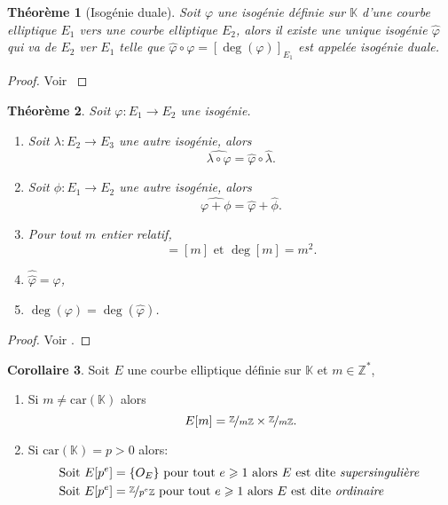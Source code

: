 \documentclass[10pt,a4paper]{book}
\theoremstyle{plain}
\newtheorem{thm}{Théorème}[chapter]
\theoremstyle{definition}
\theoremstyle{definition}
\newtheorem{cor}[thm]{Corollaire}
\theoremstyle{definition}
\theoremstyle{definition}
\theoremstyle{remark}
\theoremstyle{remark}
\theoremstyle{definition}
\begin{document}
\begin{thm}[Isogénie duale]
Soit $\varphi$ une isogénie définie sur $\mathbb{K}$ d'une courbe elliptique 
$E_1$ vers une courbe elliptique $E_2$, alors il existe une unique isogénie 
$\widehat{\varphi}$ qui va de $E_2$ ver $E_1$ telle que $\widehat{\varphi}\circ
\varphi=[\deg(\varphi)]_{E_1}$ est appelée \emph{isogénie duale}.
\end{thm}

\begin{proof}
Voir \cite[III.6.1]{Silv1}
\end{proof}

\begin{thm}
Soit $\varphi:E_1 \rightarrow E_2$ une isogénie.
\begin{enumerate}
\item Soit $\lambda:E_2 \rightarrow E_3$ une autre isogénie, alors
\begin{equation*}
\widehat{\lambda \circ \varphi}= \widehat{\varphi} \circ \widehat{\lambda}.
\end{equation*} 
\item Soit $\phi:E_1 \rightarrow E_2$ une autre isogénie, alors
\begin{equation*}
\widehat{\varphi+\phi}=\widehat{\varphi}+\widehat{\phi}.
\end{equation*}
\item Pour tout $m$ entier relatif,
\begin{equation*}
[\widehat{m}]=[m] \text{ et } \deg[m]=m^2.
\end{equation*}
\item $\widehat{\widehat{\varphi}}=\varphi$,
\item $\deg(\varphi)=\deg(\widehat{\varphi})$.
\end{enumerate}
 
\end{thm}

\begin{proof}
Voir \cite[Theorem III.6.2]{Silv1}.
\end{proof}

\begin{cor}
Soit $E$ une courbe elliptique définie sur $\mathbb{K}$ et $m \in \mathbb{Z}^*$,
\begin{enumerate}
\item Si $m \neq \mathrm{car}(\mathbb{K})$ alors
\begin{equation*}
E[m]=\nicefrac{\mathbb{Z}}{m\mathbb{Z}} \times \nicefrac{\mathbb{Z}}{m\mathbb{Z}}. 
\end{equation*}
\item Si $\mathrm{car}(\mathbb{K})=p>0$ alors:
\begin{equation*}
\begin{alignedat}{1}
&\text{Soit } E[p^e]=\{O_E\} \text{ pour tout } e \geqslant 1 \text{ alors $E$ est dite \emph{supersingulière} }\\
&\text{Soit } E[p^e]=\nicefrac{\mathbb{Z}}{p^e\mathbb{Z}} \text{ pour tout } e \geqslant 1
\text{ alors $E$ est dite \emph{ordinaire} }\end{alignedat}
\end{equation*}
\end{enumerate}
\end{cor}
\end{document}

